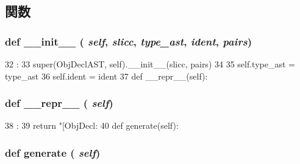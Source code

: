 \subsection{関数}
\hypertarget{classslicc_1_1ast_1_1ObjDeclAST_1_1ObjDeclAST_ac775ee34451fdfa742b318538164070e}{
\subsubsection[{\_\-\_\-init\_\-\_\-}]{\setlength{\rightskip}{0pt plus 5cm}def \_\-\_\-init\_\-\_\- ( {\em self}, \/   {\em slicc}, \/   {\em type\_\-ast}, \/   {\em ident}, \/   {\em pairs})}}
\label{classslicc_1_1ast_1_1ObjDeclAST_1_1ObjDeclAST_ac775ee34451fdfa742b318538164070e}



\begin{DoxyCode}
32                                                      :
33         super(ObjDeclAST, self).__init__(slicc, pairs)
34 
35         self.type_ast = type_ast
36         self.ident = ident
37 
    def __repr__(self):
\end{DoxyCode}
\hypertarget{classslicc_1_1ast_1_1ObjDeclAST_1_1ObjDeclAST_ad8b9328939df072e4740cd9a63189744}{
\subsubsection[{\_\-\_\-repr\_\-\_\-}]{\setlength{\rightskip}{0pt plus 5cm}def \_\-\_\-repr\_\-\_\- ( {\em self})}}
\label{classslicc_1_1ast_1_1ObjDeclAST_1_1ObjDeclAST_ad8b9328939df072e4740cd9a63189744}



\begin{DoxyCode}
38                       :
39         return "[ObjDecl: %
40 
    def generate(self):
\end{DoxyCode}
\hypertarget{classslicc_1_1ast_1_1ObjDeclAST_1_1ObjDeclAST_a4555d1cee0dccf3942ea35fe86de2e8e}{
\subsubsection[{generate}]{\setlength{\rightskip}{0pt plus 5cm}def generate ( {\em self})}}
\label{classslicc_1_1ast_1_1ObjDeclAST_1_1ObjDeclAST_a4555d1cee0dccf3942ea35fe86de2e8e}



